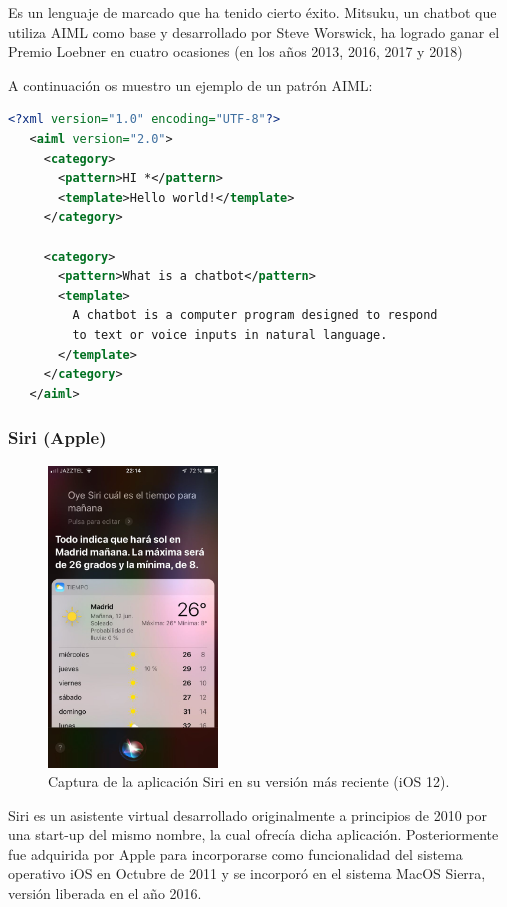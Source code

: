 \documentclass[spanish,12pt, a4paper, twoside]{paper}
\begin{document}
Es un lenguaje de marcado que ha tenido cierto éxito. Mitsuku, un chatbot que utiliza AIML como base y desarrollado por Steve Worswick, ha logrado ganar el Premio Loebner en cuatro ocasiones (en los años 2013, 2016, 2017 y 2018)

A continuación os muestro un ejemplo de un patrón AIML:
\begin{lstlisting}[language=xml]
<?xml version="1.0" encoding="UTF-8"?>
   <aiml version="2.0">
     <category>
       <pattern>HI *</pattern>
       <template>Hello world!</template>
     </category>

     <category>
       <pattern>What is a chatbot</pattern>
       <template>
         A chatbot is a computer program designed to respond
         to text or voice inputs in natural language.
       </template>
     </category>
   </aiml>
\end{lstlisting}

\subsubsection{Siri (Apple)}

\begin{figure}
\centering
	\includegraphics[width=0.4\textwidth]{recursos/siri}
\caption{Captura de la aplicación Siri en su versión más reciente (iOS 12).}
\label{fig:Siri}
\end{figure}

Siri es un asistente virtual desarrollado originalmente a principios de 2010 por una start-up del mismo nombre, la cual ofrecía dicha aplicación. Posteriormente fue adquirida por Apple para incorporarse como funcionalidad del sistema operativo iOS en Octubre de 2011 y se incorporó en el sistema MacOS Sierra, versión liberada en el año 2016.
\newline
\end{document}
